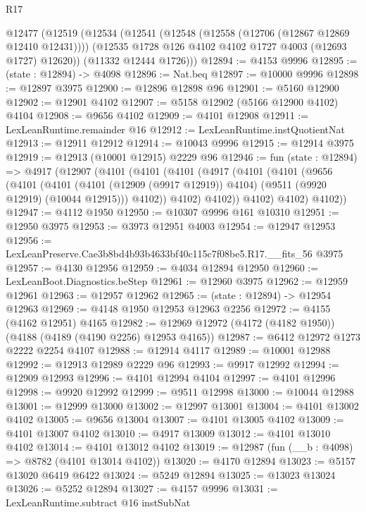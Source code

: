 \begin{lexlean}{R17}
\begin{coremodule}
  @12477
    (@12519
      (@12534
        (@12541
          (@12548 (@12558 (@12706 (@12867 @12869 @12410 @12431))))
          (@12535 @1728 @126 @4102 @4102 @1727 @4003 (@12693 @1727) @12620))
        (@11332 @12444 @1726)))
@12894 := @4153 @9996
@12895 := (state : @12894) -> @4098
@12896 := Nat.beq
@12897 := @10000 @9996
@12898 := @12897 @3975
@12900 := @12896 @12898 @96
@12901 := @5160 @12900
@12902 := @12901 @4102
@12907 := @5158 @12902 (@5166 @12900 @4102) @4104
@12908 := @9656 @4102
@12909 := @4101 @12908
@12911 := LexLeanRuntime.remainder @16
@12912 := LexLeanRuntime.instQuotientNat
@12913 := @12911 @12912
@12914 := @10043 @9996
@12915 := @12914 @3975
@12919 := @12913 (@10001 @12915) @2229 @96
@12946 := fun (state : @12894) =>
  @4917
    (@12907
      (@4101
        (@4101
          (@4101
            (@4917
              (@4101
                (@4101
                  (@9656
                    (@4101
                      (@4101
                        (@4101 (@12909 (@9917 @12919)) @4104)
                        (@9511 (@9920 @12919) (@10044 @12915)))
                      @4102))
                  @4102)
                @4102))
            @4102)
          @4102)
        @4102))
@12947 := @4112 @1950
@12950 := @10307 @9996 @161 @10310
@12951 := @12950 @3975
@12953 := @3973 @12951 @4003
@12954 := @12947 @12953
@12956 := LexLeanPreserve.Cae3b8bd4b93b4633bf40c115c7f08be5.R17.__fits_56 @3975
@12957 := @4130 @12956
@12959 := @4034 @12894 @12950
@12960 := LexLeanBoot.Diagnostics.beStep
@12961 := @12960 @3975
@12962 := @12959 @12961
@12963 := @12957 @12962
@12965 := (state : @12894) -> @12954 @12963
@12969 := @4148 @1950 @12953 @12963 @2256
@12972 := @4155 (@4162 @12951) @4165
@12982 := @12969 @12972 (@4172 (@4182 @1950)) (@4188 (@4189 (@4190 @2256) @12953 @4165))
@12987 := @6412 @12972 @1273 @2222 @2254 @4107
@12988 := @12914 @4117
@12989 := @10001 @12988
@12992 := @12913 @12989 @2229 @96
@12993 := @9917 @12992
@12994 := @12909 @12993
@12996 := @4101 @12994 @4104
@12997 := @4101 @12996
@12998 := @9920 @12992
@12999 := @9511 @12998
@13000 := @10044 @12988
@13001 := @12999 @13000
@13002 := @12997 @13001
@13004 := @4101 @13002 @4102
@13005 := @9656 @13004
@13007 := @4101 @13005 @4102
@13009 := @4101 @13007 @4102
@13010 := @4917 @13009
@13012 := @4101 @13010 @4102
@13014 := @4101 @13012 @4102
@13019 := @12987 (fun (__b : @4098) => @8782 (@4101 @13014 @4102))
@13020 := @4170 @12894
@13023 := @5157 @13020 @6419 @6422
@13024 := @5249 @12894
@13025 := @13023 @13024
@13026 := @5252 @12894
@13027 := @4157 @9996
@13031 := LexLeanRuntime.subtract @16 instSubNat

\end{coremodule}
\end{lexlean}
